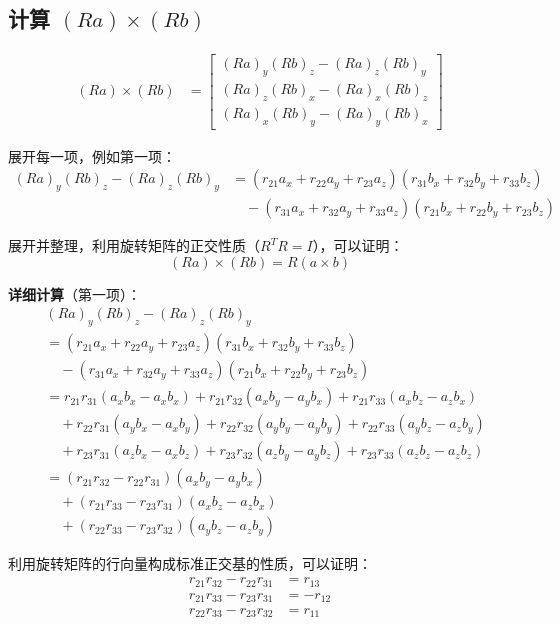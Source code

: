 \documentclass[12pt,a4paper]{article}
\begin{document}
\subsection{计算 $(Ra) \times (Rb)$}

\begin{align}
(Ra) \times (Rb) &= \begin{bmatrix}
(Ra)_y (Rb)_z - (Ra)_z (Rb)_y \\
(Ra)_z (Rb)_x - (Ra)_x (Rb)_z \\
(Ra)_x (Rb)_y - (Ra)_y (Rb)_x
\end{bmatrix}
\end{align}

展开每一项，例如第一项：
\begin{align}
(Ra)_y (Rb)_z - (Ra)_z (Rb)_y &= (r_{21} a_x + r_{22} a_y + r_{23} a_z)(r_{31} b_x + r_{32} b_y + r_{33} b_z) \\
&\quad - (r_{31} a_x + r_{32} a_y + r_{33} a_z)(r_{21} b_x + r_{22} b_y + r_{23} b_z)
\end{align}

展开并整理，利用旋转矩阵的正交性质（$R^T R = I$），可以证明：
\begin{equation}
(Ra) \times (Rb) = R(a \times b)
\end{equation}

\textbf{详细计算}（第一项）：
\begin{align}
&(Ra)_y (Rb)_z - (Ra)_z (Rb)_y \\
&= (r_{21} a_x + r_{22} a_y + r_{23} a_z)(r_{31} b_x + r_{32} b_y + r_{33} b_z) \\
&\quad - (r_{31} a_x + r_{32} a_y + r_{33} a_z)(r_{21} b_x + r_{22} b_y + r_{23} b_z) \\
&= r_{21} r_{31} (a_x b_x - a_x b_x) + r_{21} r_{32} (a_x b_y - a_y b_x) + r_{21} r_{33} (a_x b_z - a_z b_x) \\
&\quad + r_{22} r_{31} (a_y b_x - a_x b_y) + r_{22} r_{32} (a_y b_y - a_y b_y) + r_{22} r_{33} (a_y b_z - a_z b_y) \\
&\quad + r_{23} r_{31} (a_z b_x - a_x b_z) + r_{23} r_{32} (a_z b_y - a_y b_z) + r_{23} r_{33} (a_z b_z - a_z b_z) \\
&= (r_{21} r_{32} - r_{22} r_{31})(a_x b_y - a_y b_x) \\
&\quad + (r_{21} r_{33} - r_{23} r_{31})(a_x b_z - a_z b_x) \\
&\quad + (r_{22} r_{33} - r_{23} r_{32})(a_y b_z - a_z b_y)
\end{align}

利用旋转矩阵的行向量构成标准正交基的性质，可以证明：
\begin{align}
r_{21} r_{32} - r_{22} r_{31} &= r_{13} \\
r_{21} r_{33} - r_{23} r_{31} &= -r_{12} \\
r_{22} r_{33} - r_{23} r_{32} &= r_{11}
\end{align}
\end{document}

